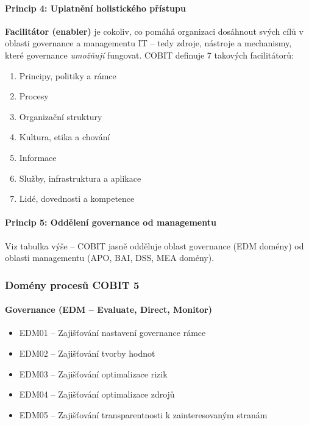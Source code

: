 \paragraph{Princip 4: Uplatnění holistického přístupu}
\textbf{Facilitátor (enabler)} je cokoliv, co pomáhá organizaci dosáhnout svých cílů v oblasti governance a managementu IT -- tedy zdroje, nástroje a mechanismy, které governance \textit{umožňují} fungovat.
COBIT definuje 7 takových facilitátorů:
\begin{enumerate}
  \item Principy, politiky a rámce
  \item Procesy
  \item Organizační struktury
  \item Kultura, etika a chování
  \item Informace
  \item Služby, infrastruktura a aplikace
  \item Lidé, dovednosti a kompetence
\end{enumerate}

\paragraph{Princip 5: Oddělení governance od managementu}
Viz tabulka výše -- COBIT jasně odděluje oblast governance (EDM domény) od oblasti managementu
(APO, BAI, DSS, MEA domény).

\subsubsection{Domény procesů COBIT 5}

\paragraph{Governance (EDM -- Evaluate, Direct, Monitor)}
\begin{itemize}
  \item EDM01 -- Zajišťování nastavení governance rámce
  \item EDM02 -- Zajišťování tvorby hodnot
  \item EDM03 -- Zajišťování optimalizace rizik
  \item EDM04 -- Zajišťování optimalizace zdrojů
  \item EDM05 -- Zajišťování transparentnosti k zainteresovaným stranám
\end{itemize}

